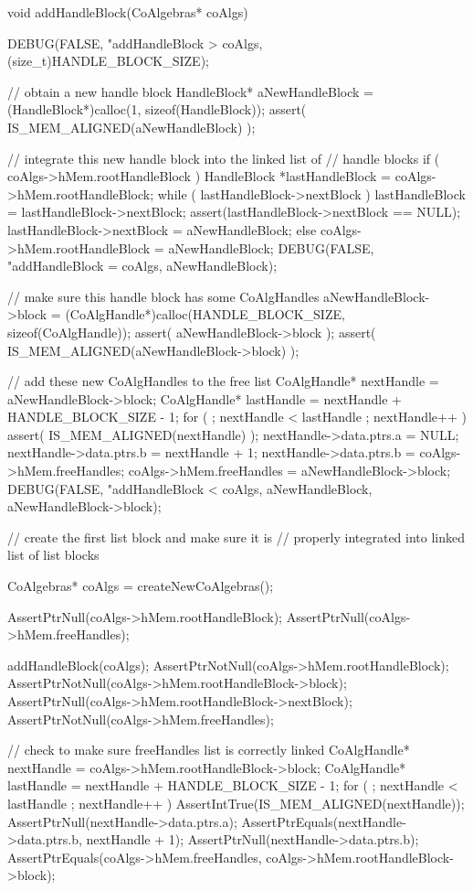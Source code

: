 \startCCode
void addHandleBlock(CoAlgebras* coAlgs) {
  DEBUG(FALSE, "addHandleBlock > %
    coAlgs, (size_t)HANDLE_BLOCK_SIZE);

  // obtain a new handle block
  HandleBlock* aNewHandleBlock = 
    (HandleBlock*)calloc(1, sizeof(HandleBlock));
  assert( IS_MEM_ALIGNED(aNewHandleBlock) );

  // integrate this new handle block into the linked list of
  // handle blocks
  if ( coAlgs->hMem.rootHandleBlock ) {
    HandleBlock *lastHandleBlock = coAlgs->hMem.rootHandleBlock;
    while ( lastHandleBlock->nextBlock ) {
      lastHandleBlock = lastHandleBlock->nextBlock;
    }
    assert(lastHandleBlock->nextBlock == NULL);
    lastHandleBlock->nextBlock = aNewHandleBlock;
  } else {
    coAlgs->hMem.rootHandleBlock = aNewHandleBlock;
  }
  DEBUG(FALSE, "addHandleBlock = %
    coAlgs, aNewHandleBlock);

  // make sure this handle block has some CoAlgHandles
  aNewHandleBlock->block = 
    (CoAlgHandle*)calloc(HANDLE_BLOCK_SIZE, sizeof(CoAlgHandle));
  assert( aNewHandleBlock->block );
  assert( IS_MEM_ALIGNED(aNewHandleBlock->block) );

  // add these new CoAlgHandles to the free list
  CoAlgHandle* nextHandle = aNewHandleBlock->block;
  CoAlgHandle* lastHandle = nextHandle + HANDLE_BLOCK_SIZE - 1;
  for ( ; nextHandle < lastHandle ; nextHandle++ ) {
    assert( IS_MEM_ALIGNED(nextHandle) );
    nextHandle->data.ptrs.a = NULL;
    nextHandle->data.ptrs.b = nextHandle + 1;
  }
  nextHandle->data.ptrs.b = coAlgs->hMem.freeHandles;
  coAlgs->hMem.freeHandles = aNewHandleBlock->block;
  DEBUG(FALSE, "addHandleBlock < %
    coAlgs, aNewHandleBlock, aNewHandleBlock->block);
}
\stopCCode

\startCTest
  // create the first list block and make sure it is 
  // properly integrated into linked list of list blocks

  CoAlgebras* coAlgs = createNewCoAlgebras();

  AssertPtrNull(coAlgs->hMem.rootHandleBlock);
  AssertPtrNull(coAlgs->hMem.freeHandles);

  addHandleBlock(coAlgs);
  AssertPtrNotNull(coAlgs->hMem.rootHandleBlock);
  AssertPtrNotNull(coAlgs->hMem.rootHandleBlock->block);
  AssertPtrNull(coAlgs->hMem.rootHandleBlock->nextBlock);
  AssertPtrNotNull(coAlgs->hMem.freeHandles);

  // check to make sure freeHandles list is correctly linked
  CoAlgHandle* nextHandle = coAlgs->hMem.rootHandleBlock->block;
  CoAlgHandle* lastHandle = nextHandle + HANDLE_BLOCK_SIZE - 1;
  for ( ; nextHandle < lastHandle ; nextHandle++ ) {
    AssertIntTrue(IS_MEM_ALIGNED(nextHandle));
    AssertPtrNull(nextHandle->data.ptrs.a);
    AssertPtrEquals(nextHandle->data.ptrs.b, nextHandle + 1);
  }
  AssertPtrNull(nextHandle->data.ptrs.b);
  AssertPtrEquals(coAlgs->hMem.freeHandles,
    coAlgs->hMem.rootHandleBlock->block);


